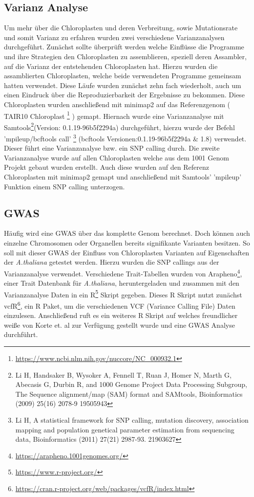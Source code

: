 \documentclass{scrartcl}
\begin{document}
\subsection{Varianz Analyse}
\label{sec-3-3}
Um mehr über die Chloroplasten und deren Verbreitung, sowie Mutationsrate und somit Varianz zu erfahren wurden zwei verschiedene Varianzanalysen durchgeführt. 
Zunächst sollte überprüft werden welche Einflüsse die Programme und ihre Strategien den Chloroplasten zu assemblieren, speziell deren Assambler, auf die Varianz der 
entstehenden Chloroplasten hat. Hierzu wurden die assamblierten Chloroplasten, welche beide verwendeten Programme gemeinsam hatten verwendet. Diese Läufe wurden zunächst
zehn fach wiederholt, auch um einen Eindruck über die Reproduzierbarkeit der Ergebnisse zu bekommen. Diese Chloroplasten wurden anschließend mit minimap2 \footnotemark[46]{} auf das 
Referenzgenom ( TAIR10 Chloroplast \footnote{\url{https://www.ncbi.nlm.nih.gov/nuccore/NC_000932.1}} ) gemapt. Hiernach wurde eine Varianzanalyse mit Samtools\footnote{Li H, Handsaker B, Wysoker A, Fennell T, Ruan J, Homer N, Marth G, Abecasis G, Durbin R, and 1000 Genome Project Data Processing Subgroup, The Sequence alignment/map (SAM) format and SAMtools, Bioinformatics (2009) 25(16) 2078-9 19505943}(Version: 0.1.19-96b5f2294a) durchgeführt, hierzu wurde der Befehl
'mpileup/bcftools call' \footnote{Li H, A statistical framework for SNP calling, mutation discovery, association mapping and population genetical parameter estimation from sequencing data, Bioinformatics (2011) 27(21) 2987-93. 21903627} (bcftools Versionen:0.1.19-96b5f2294a \& 1.8) verwendet. Dieser führt eine Varianzanalyse bzw. ein SNP calling durch. Die zweite Varianzanalyse wurde auf allen Chloroplasten welche aus dem
1001 Genom Projekt gebaut wurden erstellt. Auch diese wurden auf den Referenz Chloroplasten mit minimap2 gemapt und anschließend mit Samtools' 'mpileup' Funktion einem
SNP calling unterzogen. 

\subsection{GWAS}
\label{sec-3-4}
Häufig wird eine GWAS über das komplette Genom berechnet. Doch können auch einzelne Chromosomen oder Organellen bereits signifikante Varianten besitzen. 
So soll mit dieser GWAS der Einfluss von Chloroplasten Varianten auf Eigenschaften der \emph{A.thaliana} getestet werden. Hierzu wurden die SNP callings aus der Varianzanalyse verwendet.
Verschiedene Trait-Tabellen wurden von Arapheno\footnote{\url{https://arapheno.1001genomes.org/}}, einer Trait Datenbank für \emph{A.thaliana}, heruntergeladen und zusammen mit den Varianzanalyse Daten in ein R\footnote{\url{https://www.r-project.org/}} Skript gegeben.
Dieses R Skript nutzt zunächst vcfR\footnote{\url{https://cran.r-project.org/web/packages/vcfR/index.html}}, ein R Paket, um die verschiedenen VCF (Variance Calling File) Daten einzulesen. Anschließend ruft es ein weiteres R Skript auf welches
freundlicher weiße von Korte et. al\footnotemark[39]{} zur Verfügung gestellt wurde und eine GWAS Analyse durchführt.
\end{document}
